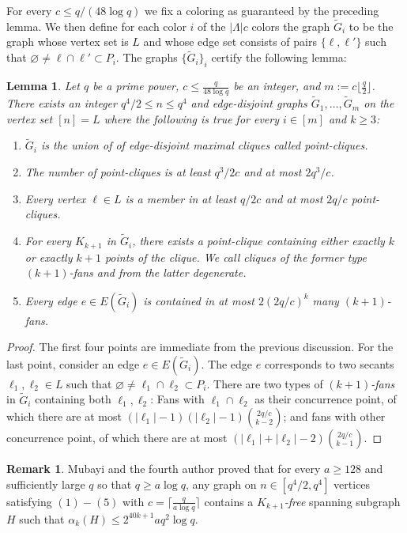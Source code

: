 \documentclass[12pt]{article}
\newtheorem{lemma}{Lemma}
\theoremstyle{definition}
\newtheorem{remark}{Remark}
\begin{document}
	For every $c \leq q/(48\log q)$ we fix a coloring as guaranteed by the preceding lemma. We then define for each color $i$ of the $|\Lambda|c$ colors the graph $\tilde{G}_i$ to be the graph whose vertex set is $L$ and whose edge set consists of pairs $\{\ell,\ell'\}$ such that $\varnothing \neq\ell \cap \ell' \subset P_i$. The graphs $\{\tilde{G}_i\}_i$ certify the following lemma:
	\begin{lemma} \label{lem: graphlemma}
		Let $q$ be a prime power, $c\leq \frac{q}{48\log q}$ be an integer, and $m :=c\lfloor\frac{q}{2}\rfloor$. There exists an integer $q^4/2\leq n \leq q^4$ and edge-disjoint graphs $\tilde{G}_1,\dots,\tilde{G}_m$ on the vertex set $[n]=L$ where the following  is true for every $i \in [m]$ and $k\geq 3$:
		\begin{enumerate}
			\item $\tilde{G}_i$ is the union of of edge-disjoint maximal cliques called \em{point-cliques}.
			\item The number of point-cliques is at least  $q^3/2c$ and at most $2q^3/c$.
			\item Every vertex $\ell \in L$ is a member in at least $q/2c$ and at most $2q/c$ point-cliques.
			\item For every $K_{k+1}$ in $\tilde{G}_i$, there exists a point-clique containing either exactly $k$ or exactly $k+1$ points of the clique. We call cliques of the former type $(k+1)$\textit{-fans} and from the latter degenerate.
			\item Every edge $e \in E(\tilde{G}_i)$ is contained in at most $2(2q/c)^k$ many $(k+1)$\textit{-fans}.
		\end{enumerate}
	\end{lemma}
	\begin{proof} The first four points are immediate from the previous discussion.  For the last point, consider an edge $e \in E(\tilde{G}_i).$ The edge $e$ corresponds to two secants $\ell_1,\ell_2\in L$ such that $\varnothing\neq\ell_1\cap\ell_2\subset P_i.$   There are two types of $(k+1)$\textit{-fans} in $\tilde{G}_i$ containing both $\ell_1,\ell_2$: Fans with $\ell_1\cap\ell_2$ as their concurrence point, of which there are at most $(|\ell_1|-1)(|\ell_2|-1)\binom{2q/c}{k-2}$; and fans with other concurrence point, of which there are at most $(|\ell_1|+|\ell_2|-2)\binom{2q/c}{k-1}$.
	\end{proof}
	\begin{remark}\label{Rem:MVConstant}
		Mubayi and the fourth author \cite{mubayi2024order} proved that for every $a\geq 128$ and sufficiently large $q$ so that $q \geq a \log q$, any graph on $n \in [q^4/2,q^4]$ vertices satisfying $(1)-(5)$ with $c=\lceil\frac{q}{a \log q}\rceil$ contains a $K_{k+1}$\textit{-free} spanning subgraph $H$ such that $\alpha_k(H)\leq 2^{40k+1}aq^2\log q$.
	\end{remark}
	
\end{document}
